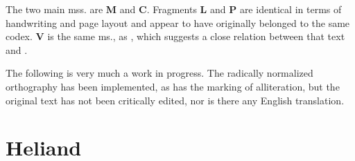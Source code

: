 The two main mss. are \textbf{M} and \textbf{C}.  Fragments \textbf{L} and \textbf{P} are identical in terms of handwriting and page layout and appear to have originally belonged to the same codex.  \textbf{V} is the same ms., as \SaxonGenesis, which suggests a close relation between that text and \Heliand.

\sectionline

The following is very much a work in progress.  The radically normalized orthography has been implemented, as has the marking of alliteration, but the original text has not been critically edited, nor is there any English translation.

\sectionline

\section{Heliand}

